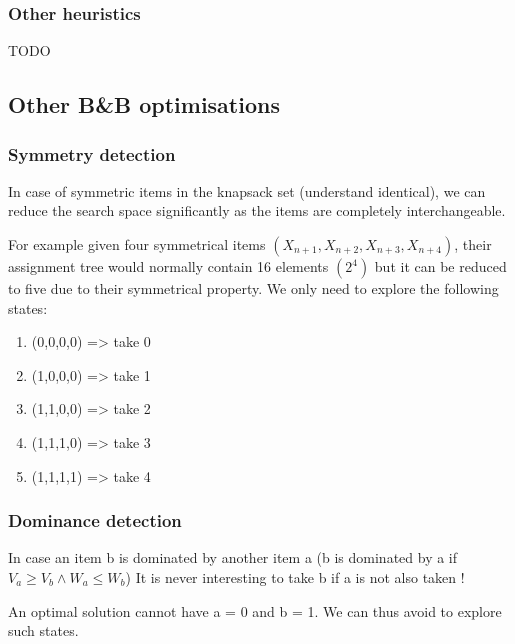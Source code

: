 \subsubsection{Other heuristics}

TODO

\subsection{Other B\&B optimisations}

\subsubsection{Symmetry detection}

In case of symmetric items in the knapsack set (understand identical), we can reduce the
search space significantly as the items are completely interchangeable.\newline

For example given four symmetrical items $(X_{n+1}, X_{n+2}, X_{n+3}, X_{n+4})$, 
their assignment tree would normally contain 16 elements $(2^4)$ but it can 
be reduced to five due to their symmetrical property. 
We only need to explore the following states:

\begin{enumerate}
	\item (0,0,0,0) => take 0
	\item (1,0,0,0) => take 1
	\item (1,1,0,0) => take 2
	\item (1,1,1,0) => take 3
	\item (1,1,1,1) => take 4
\end{enumerate}

\subsubsection{Dominance detection}

In case an item b is dominated by another item a
(b is dominated by a if $V_a \geq V_b \wedge W_a \leq W_b$)
It is never interesting to take b if a is not also taken ! \newline

An optimal solution cannot have a = 0 and b = 1. 
We can thus avoid to explore such states.



